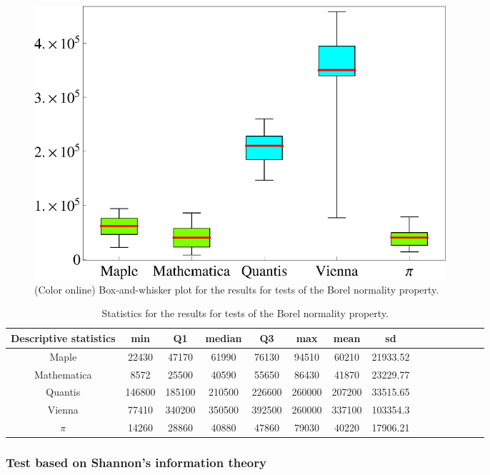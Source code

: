 \documentclass[%
 preprint,
 showpacs,
 showkeys,
 preprintnumbers,
 amsmath,amssymb,
 aps,
 prl,
  longbibliography,
 ]{revtex4-1}
\begin{document}
\begin{figure}[htbp] %
   \centering
   \includegraphics[width=6in]{2009-QvPR-boxborelk2}
   \caption{(Color online) Box-and-whisker plot for the results for tests of the Borel normality property.}
   \label{fig:example1}
\end{figure}

\begin{table}
\caption{Statistics for the results for tests of the Borel normality property.}\label{tab:1}
\begin{center}
\begin{tabular}
[c]{c c c c c c c c c c c c c c c }%
\hline\hline
Descriptive statistics & min & Q1 & median & Q3 & max & mean & sd\\\hline
Maple & 22430 & 47170 & 61990 & 76130 & 94510 & 60210 & 21933.52\\
Mathematica & 8572 & 25500 & 40590 & 55650 & 86430 & 41870 & 23229.77\\
Quantis & 146800 & 185100 & 210500 & 226600 & 260000 & 207200 & 33515.65\\
Vienna & 77410 & 340200 & 350500 & 392500 & 260000 & 337100 & 103354.3\\
$\pi$ & 14260 & 28860 & 40880 & 47860 & 79030 & 40220 & 17906.21\\\hline\hline
\end{tabular}
\end{center}
\end{table}



\subsubsection{Test based on Shannon's information theory}
\end{document}
